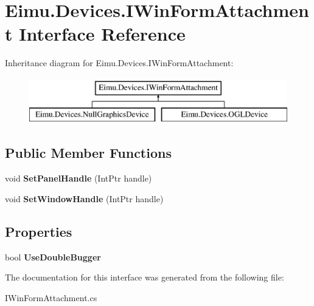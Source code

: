 \hypertarget{interface_eimu_1_1_devices_1_1_i_win_form_attachment}{
\section{Eimu.Devices.IWinFormAttachment Interface Reference}
\label{interface_eimu_1_1_devices_1_1_i_win_form_attachment}
}
Inheritance diagram for Eimu.Devices.IWinFormAttachment:\begin{figure}[H]
\begin{center}
\leavevmode
\includegraphics[height=2.000000cm]{interface_eimu_1_1_devices_1_1_i_win_form_attachment}
\end{center}
\end{figure}
\subsection*{Public Member Functions}
\begin{DoxyCompactItemize}
\item 
\hypertarget{interface_eimu_1_1_devices_1_1_i_win_form_attachment_aa8e181d8804796f828462796cc67e504}{
void {\bfseries SetPanelHandle} (IntPtr handle)}
\label{interface_eimu_1_1_devices_1_1_i_win_form_attachment_aa8e181d8804796f828462796cc67e504}

\item 
\hypertarget{interface_eimu_1_1_devices_1_1_i_win_form_attachment_a977f38ce4162ea503af542137f08a474}{
void {\bfseries SetWindowHandle} (IntPtr handle)}
\label{interface_eimu_1_1_devices_1_1_i_win_form_attachment_a977f38ce4162ea503af542137f08a474}

\end{DoxyCompactItemize}
\subsection*{Properties}
\begin{DoxyCompactItemize}
\item 
\hypertarget{interface_eimu_1_1_devices_1_1_i_win_form_attachment_a5242c77ecb3ea8c687c50bd2f13a731f}{
bool {\bfseries UseDoubleBugger}}
\label{interface_eimu_1_1_devices_1_1_i_win_form_attachment_a5242c77ecb3ea8c687c50bd2f13a731f}

\end{DoxyCompactItemize}


The documentation for this interface was generated from the following file:\begin{DoxyCompactItemize}
\item 
IWinFormAttachment.cs\end{DoxyCompactItemize}

